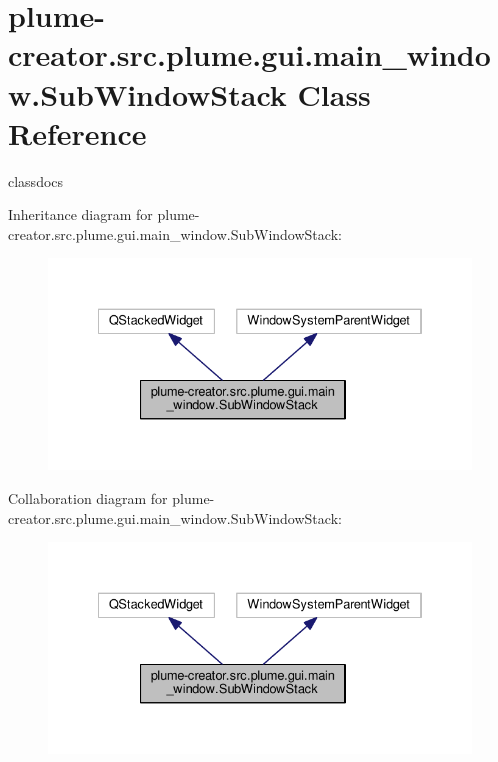 \hypertarget{classplume-creator_1_1src_1_1plume_1_1gui_1_1main__window_1_1_sub_window_stack}{}\section{plume-\/creator.src.\+plume.\+gui.\+main\+\_\+window.\+Sub\+Window\+Stack Class Reference}
\label{classplume-creator_1_1src_1_1plume_1_1gui_1_1main__window_1_1_sub_window_stack}


classdocs  




Inheritance diagram for plume-\/creator.src.\+plume.\+gui.\+main\+\_\+window.\+Sub\+Window\+Stack\+:\nopagebreak
\begin{figure}[H]
\begin{center}
\leavevmode
\includegraphics[width=334pt]{classplume-creator_1_1src_1_1plume_1_1gui_1_1main__window_1_1_sub_window_stack__inherit__graph}
\end{center}
\end{figure}


Collaboration diagram for plume-\/creator.src.\+plume.\+gui.\+main\+\_\+window.\+Sub\+Window\+Stack\+:\nopagebreak
\begin{figure}[H]
\begin{center}
\leavevmode
\includegraphics[width=334pt]{classplume-creator_1_1src_1_1plume_1_1gui_1_1main__window_1_1_sub_window_stack__coll__graph}
\end{center}
\end{figure}
